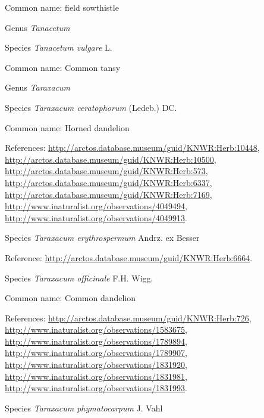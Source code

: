 \documentclass[9pt, article]{memoir}
\begin{document}
\begin{multicols}{2}
Common name: field sowthistle

\vspace{6pt}\noindent\hspace{30pt}Genus \textit{Tanacetum}


\vspace{6pt}\noindent\hspace{36pt}Species \textit{Tanacetum vulgare} L.


Common name: Common tansy

\vspace{6pt}\noindent\hspace{30pt}Genus \textit{Taraxacum}


\vspace{6pt}\noindent\hspace{36pt}Species \textit{Taraxacum ceratophorum} (Ledeb.) DC.


Common name: Horned dandelion

References: 
\url{http://arctos.database.museum/guid/KNWR:Herb:10448}, 
\url{http://arctos.database.museum/guid/KNWR:Herb:10500}, 
\url{http://arctos.database.museum/guid/KNWR:Herb:573}, 
\url{http://arctos.database.museum/guid/KNWR:Herb:6337}, 
\url{http://arctos.database.museum/guid/KNWR:Herb:7169}, 
\url{http://www.inaturalist.org/observations/4049494}, 
\url{http://www.inaturalist.org/observations/4049913}.

\vspace{6pt}\noindent\hspace{36pt}Species \textit{Taraxacum erythrospermum} Andrz. ex Besser


Reference: 
\url{http://arctos.database.museum/guid/KNWR:Herb:6664}.

\vspace{6pt}\noindent\hspace{36pt}Species \textit{Taraxacum officinale} F.H. Wigg.


Common name: Common dandelion

References: 
\url{http://arctos.database.museum/guid/KNWR:Herb:726}, 
\url{http://www.inaturalist.org/observations/1583675}, 
\url{http://www.inaturalist.org/observations/1789894}, 
\url{http://www.inaturalist.org/observations/1789907}, 
\url{http://www.inaturalist.org/observations/1831920}, 
\url{http://www.inaturalist.org/observations/1831981}, 
\url{http://www.inaturalist.org/observations/1831993}.

\vspace{6pt}\noindent\hspace{36pt}Species \textit{Taraxacum phymatocarpum} J. Vahl



\end{multicols}
\end{document}
